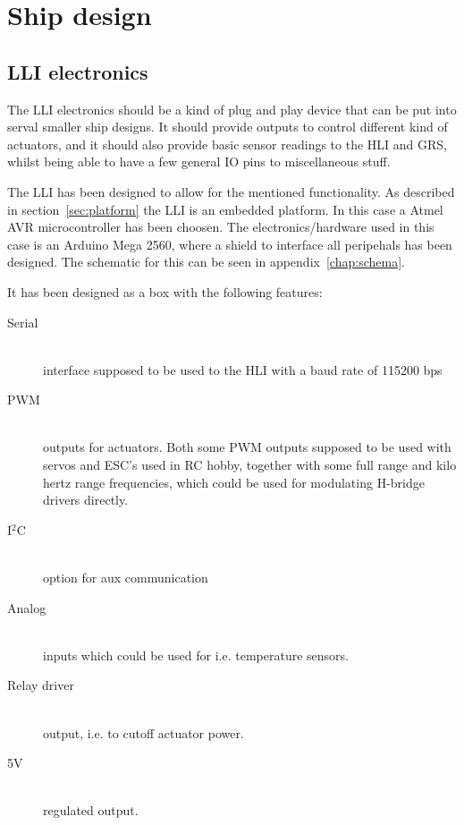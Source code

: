 \chapter{Ship design}

\section{LLI electronics}
The \ac{LLI} electronics should be a kind of plug and play device that can be put into serval smaller ship designs. It should provide outputs to control different kind of actuators, and it should also provide basic sensor readings to the \ac{HLI} and \ac{GRS}, whilst being able to have a few general IO pins to miscellaneous stuff.

The \ac{LLI} has been designed to allow for the mentioned functionality. As described in section~\vref{sec:platform} the \ac{LLI} is an embedded platform. In this case a Atmel AVR microcontroller has been choosen. The electronics/hardware used in this case is an Arduino Mega 2560, where a shield to interface all peripehals has been designed. The schematic for this can be seen in appendix~\vref{chap:schema}.

It has been designed as a box with the following features:
\begin{description}
\item[Serial]\hfill \\ interface supposed to be used to the \ac{HLI} with a baud rate of 115200 bps
\item[PWM]\hfill \\ outputs for actuators. Both some PWM outputs supposed to be used with servos and \ac{ESC}'s used in RC hobby, together with some full range and kilo hertz range frequencies, which could be used for modulating H-bridge drivers directly.
\item[I$^2$C]\hfill \\ option for aux communication 
\item[Analog]\hfill \\ inputs which could be used for i.e. temperature sensors.
\item[Relay driver]\hfill \\ output, i.e. to cutoff actuator power.
\item[5V]\hfill \\ regulated output.
\end{description}

